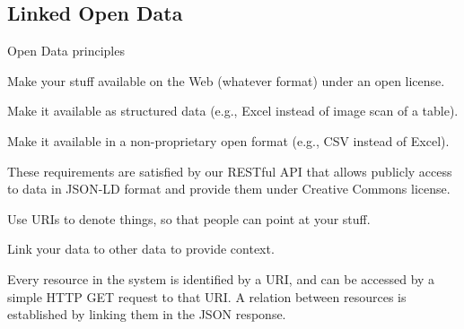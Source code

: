 \subsection[Linked Open Data]{Linked Open Data}

\begin{frame}[allowframebreaks]{Open Data principles\autocite{Berners-Lee_2006}}
	\begin{block}{\faStar\faStarO\faStarO\faStarO\faStarO}
		Make your stuff available on the Web (whatever format) under an open
		license.
	\end{block}
	\vspace*{-8pt}
	\begin{block}{\faStar\faStar\faStarO\faStarO\faStarO}
		Make it available as structured data (e.g., Excel instead of image scan
		of a table).
	\end{block}
	\vspace*{-8pt}
	\begin{block}{\faStar\faStar\faStar\faStarO\faStarO}
		Make it available in a non-proprietary open format (e.g., CSV instead of
		Excel).
	\end{block}
	These requirements are satisfied by our RESTful API that allows
	publicly access to data in JSON-LD\autocite{Sporny_2014} format and provide
	them under Creative Commons license.

	\framebreak

	\begin{block}{\faStar\faStar\faStar\faStar\faStarO}
		Use URIs to denote things, so that people can point at your stuff.
	\end{block}
	\vspace*{-8pt}
	\begin{block}{\faStar\faStar\faStar\faStar\faStar}
		Link your data to other data to provide context.
	\end{block}
	Every resource in the system is identified by a URI, and can be accessed
	by a simple HTTP GET request to that URI. A relation between resources
	is established by linking them in the JSON response.
\end{frame}
